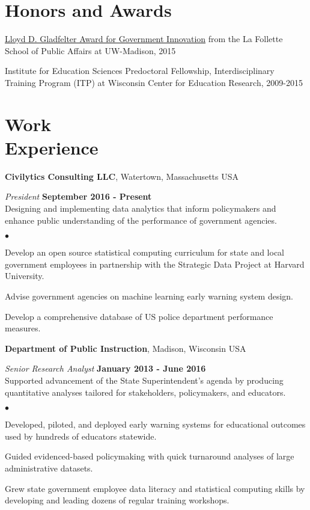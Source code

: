 \documentclass[margin,line]{res}
\newenvironment{list2}{
  \begin{list}{$\bullet$}{%
      \setlength{\itemsep}{0in}
      \setlength{\parsep}{0in} \setlength{\parskip}{0in}
      \setlength{\topsep}{0in} \setlength{\partopsep}{0in} 
      \setlength{\leftmargin}{0.2in}}}{\end{list}}
\begin{document}
\begin{resume}
\section{\sc Honors and Awards} 

\href{https://www.lafollette.wisc.edu/news/2015-gladfelter-winners-announced}{Lloyd D. Gladfelter Award for Government Innovation} from the La Follette School of Public Affairs at UW-Madison, 2015

\vspace*{-2.5mm}

Institute for Education Sciences Predoctoral Fellowship, Interdisciplinary Training Program (ITP) at Wisconsin Center for Education Research, 2009-2015

\section{\sc Work \\ Experience}
{\bf Civilytics Consulting LLC}, Watertown, Massachusetts USA

\vspace{-.3cm}
{\em President} \hfill {\bf September 2016 - Present}\\
Designing and implementing data analytics that inform policymakers and enhance 
public understanding of the performance of government agencies.\\
\vspace{-2mm}
\begin{list2}
\item Develop an open source statistical computing curriculum for state and 
local government employees in partnership with the Strategic Data Project at Harvard University.
\item Advise government agencies on machine learning early warning system design. 
\item Develop a comprehensive database of US police department performance measures.
\end{list2}
\vspace{-.1cm}

{\bf Department of Public Instruction}, Madison, Wisconsin USA

\vspace{-.3cm}
{\em Senior Research Analyst} \hfill {\bf January 2013 - June 2016}\\
Supported advancement of the State Superintendent's agenda by producing quantitative 
analyses tailored for stakeholders, policymakers, and educators. \\
\vspace{-2mm}
\begin{list2}
\item Developed, piloted, and deployed early warning systems for educational outcomes 
used by hundreds of educators statewide. 
\item Guided evidenced-based policymaking with quick turnaround analyses of large administrative datasets. 
\item Grew state government employee data literacy and statistical computing skills by developing and 
leading dozens of regular training workshops.
\end{list2}


\end{resume}
\end{document}
